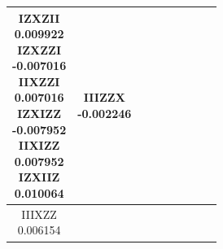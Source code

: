 \documentclass[twocolumn]{revtex4-1}
\newcommand{\1}{\mathbbm{1}}
\begin{document}
\begin{longtable}{|c|c|c|c|c|c|c|c|c|}
{IZXZII\\
0.009922\\ 
IZXZZI\\
-0.007016\\ 
IIXZZI\\
0.007016\\ 
IZXIZZ\\
-0.007952\\ 
IIXIZZ\\
0.007952\\ 
IZXIIZ\\
0.010064\\ 
\vspace{.5\baselineskip}}
&
\parbox{1.9cm}{\centering\vspace{.5\baselineskip}
IIIZZX\\
-0.002246\\ 
\vspace{.5\baselineskip}}\\								%
\hline
\parbox{1.9cm}{\centering\vspace{.5\baselineskip}
IIIXZZ \\
0.006154 \\
\vspace{.5\baselineskip}}
&
&
&
&
&
&
&
&\\
\hline
\end{longtable}
\end{document}
